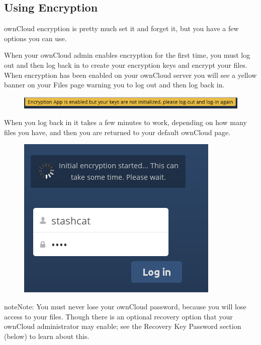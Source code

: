 \documentclass[letterpaper,10pt,english]{sphinxmanual}
\begin{document}
\subsection{Using Encryption}
\label{files/encrypting_files:using-encryption}
ownCloud encryption is pretty much set it and forget it, but you have a few
options you can use.

When your ownCloud admin enables encryption for the first time, you must log
out and then log back in to create your encryption keys and encrypt your files.
When encryption has been enabled on your ownCloud server you will see a yellow
banner on your Files page warning you to log out and then log back in.
\begin{figure}[htbp]
\centering

\includegraphics{encryption1.png}
\end{figure}

When you log back in it takes a few minutes to work, depending on how many
files you have, and then you are returned to your default ownCloud page.
\begin{figure}[htbp]
\centering

\includegraphics{encryption2.png}
\end{figure}

\begin{notice}{note}{Note:}
You must never lose your ownCloud password, because you will lose
access to your files. Though there is an optional recovery option that your
ownCloud administrator may enable; see the Recovery Key Password section
(below) to learn about this.
\end{notice}
\end{document}
